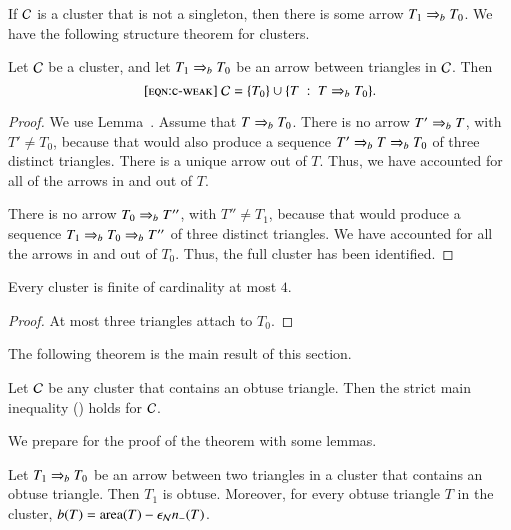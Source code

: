 If $\mathcal C$ is a cluster that is not a singleton, then there is
some arrow $T_1\Rightarrow_{b} T_0$.  We have the following structure
theorem for clusters.

\begin{theorem}
  Let $\mathcal C$ be a cluster, and let $T_1\Rightarrow_{b} T_0$ be an
  arrow between triangles in $\mathcal C$.
  Then 
  \begin{equation}\libel{eqn:c-weak}
  \C = \{T_0\}\cup \{T \mid T\rab T_0\}.
  \end{equation}
\end{theorem}

\begin{proof}  
  We use Lemma~.  Assume that $T\Rightarrow_{b} T_0$.  There
  is no arrow $T'\Rightarrow_{b} T$, with $T'\ne T_0$, because that would also
  produce a sequence $T' \Rightarrow_{b} T \Rightarrow_{b} T_0$ of  three 
  distinct triangles.  There is a unique arrow out of $T$.  Thus, we
  have accounted for all of the arrows in and out of $T$.

  There is no arrow $T_0\Rightarrow_{b} T''$, with $T''\ne T_1$, because that
  would produce a sequence $T_1\Rightarrow_{b} T_0\Rightarrow_{b} T''$ of  three 
  distinct triangles.  We have accounted for all the arrows in and
  out of $T_0$.  Thus, the full cluster has been identified.
\end{proof}

\begin{corollary}
  Every cluster is finite of cardinality at most $4$.
\end{corollary}

\begin{proof} At most three triangles attach to $T_0$.
\end{proof}

The following theorem is the main result of this
section.

\begin{theorem}  
  Let $\mathcal C$ be any cluster that contains an obtuse triangle.  Then 
   the strict main inequality ()
  holds for $\mathcal C$.
\end{theorem}

We prepare for the proof of the theorem with some lemmas.

\begin{lemma}  
  Let $T_1\Rightarrow_{b} T_0$ be an
  arrow between two triangles in a cluster that contains an obtuse
  triangle.  Then $T_1$ is obtuse.  Moreover, for every obtuse
  triangle $T$ in the cluster, $b(T) = {\operatorname{area}}(T) -\epsilon_{\mathcal N} n_-(T)$.
\end{lemma}

